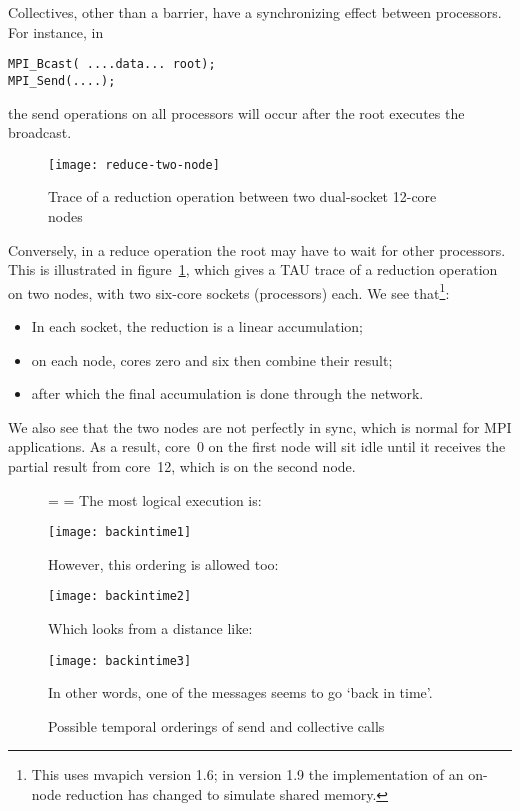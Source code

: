 Collectives, other than a barrier, have a synchronizing effect between processors.
For instance, in
\begin{lstlisting}
MPI_Bcast( ....data... root);
MPI_Send(....);
\end{lstlisting}
the send operations on all processors will occur after the root executes
the broadcast. 
\begin{figure}[ht]
  \texttt{[image: reduce-two-node]}
  \caption{Trace of a reduction operation between two dual-socket 12-core nodes}
  \label{fig:trace-reduce}
\end{figure}
Conversely, in a reduce operation the root may have to wait for 
other processors. This is illustrated in figure~\ref{fig:trace-reduce}, which 
gives a TAU trace of
a reduction operation on two nodes, with two six-core sockets (processors) each.
We see that\footnote
{This uses mvapich version 1.6; in version 1.9 the implementation of an on-node reduction
has changed to simulate shared memory.}:
\begin{itemize}
\item In each socket, the reduction is a linear accumulation;
\item on each node, cores zero and six then combine their result;
\item after which the final accumulation is done through the network.
\end{itemize}
We also see that the two nodes are not perfectly in sync, which is normal for MPI
applications. As a result, core~0 on the first node will sit idle until it receives the partial
result from core~12, which is on the second node.

\begin{figure}[p]
  \footnotesize
  \leftskip=\unitindent
  \rightskip=\unitindent
The most logical execution is:\par\medskip

\texttt{[image: backintime1]}

However, this ordering is allowed too:\par\medskip

\texttt{[image: backintime2]}

Which looks from a distance like:\par\medskip

\texttt{[image: backintime3]}

In other words, one of the messages seems to go `back in time'.

  \caption{Possible temporal orderings of send and collective calls}
  \label{fig:backintime}
\end{figure}

